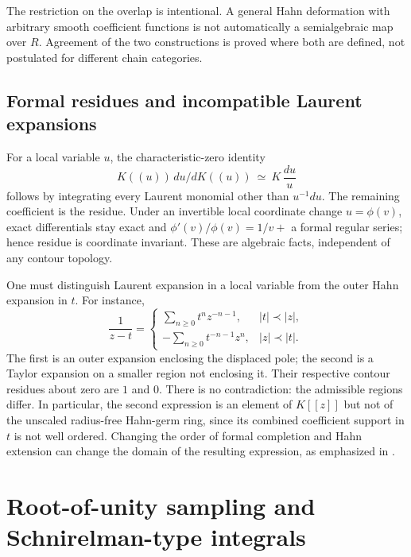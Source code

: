 \documentclass[11pt,letterpaper]{article}
\theoremstyle{definition}
\theoremstyle{remark}
\numberwithin{equation}{section}
\begin{document}
The restriction on the overlap is intentional. A general Hahn deformation with arbitrary smooth coefficient functions is not automatically a semialgebraic map over $R$. Agreement of the two constructions is proved where both are defined, not postulated for different chain categories.

\subsection{Formal residues and incompatible Laurent expansions}
For a local variable $u$, the characteristic-zero identity
\begin{equation}\label{eq:formalcohom}
 K((u))\,du\big/dK((u))\ \simeq\ K\,\frac{du}{u}
\end{equation}
follows by integrating every Laurent monomial other than $u^{-1}du$. The remaining coefficient is the residue. Under an invertible local coordinate change $u=\phi(v)$, exact differentials stay exact and
$\phi'(v)/\phi(v)=1/v+$ a formal regular series; hence residue is coordinate invariant. These are algebraic facts, independent of any contour topology.

One must distinguish Laurent expansion in a local variable from the outer Hahn expansion in $t$. For instance,
\begin{equation}\label{eq:twoexpansions}
 \frac1{z-t}=
 \begin{cases}
 \displaystyle\sum_{n\ge0}t^n z^{-n-1},& |t|\prec|z|,\\[0.7em]
 \displaystyle-\sum_{n\ge0}t^{-n-1}z^n,& |z|\prec|t|.
 \end{cases}
\end{equation}
The first is an outer expansion enclosing the displaced pole; the second is a Taylor expansion on a smaller region not enclosing it. Their respective contour residues about zero are $1$ and $0$. There is no contradiction: the admissible regions differ. In particular, the second expression is an element of $K[[z]]$ but not of the unscaled radius-free Hahn-germ ring, since its combined coefficient support in $t$ is not well ordered. Changing the order of formal completion and Hahn extension can change the domain of the resulting expression, as emphasized in \cite{Geometry}.

\section{Root-of-unity sampling and Schnirelman-type integrals}\label{sec:sampling}
\end{document}
